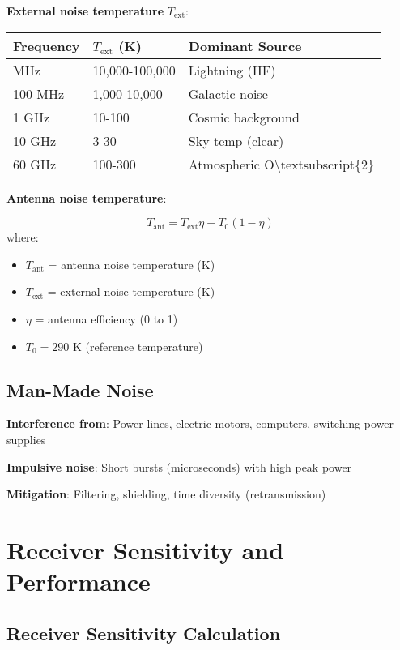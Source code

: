 \textbf{External noise temperature} $T_{\text{ext}}$:

{\def\LTcaptype{} %
\begin{longtable}[]{@{}lll@{}}
\toprule\noalign{}
Frequency & \(T_{\text{ext}}\) (K) & Dominant Source \\
\midrule\noalign{}
\endhead
\bottomrule\noalign{}
\endlastfoot
10 MHz & 10,000-100,000 & Lightning (HF) \\
100 MHz & 1,000-10,000 & Galactic noise \\
1 GHz & 10-100 & Cosmic background \\
10 GHz & 3-30 & Sky temp (clear) \\
60 GHz & 100-300 & Atmospheric O\textbackslash textsubscript\{2\} \\
\end{longtable}
}

\textbf{Antenna noise temperature}:

\begin{equation}
T_{\text{ant}} = T_{\text{ext}} \eta + T_0 (1 - \eta)
\end{equation}
where:
\begin{itemize}
\item $T_{\text{ant}}$ = antenna noise temperature (K)
\item $T_{\text{ext}}$ = external noise temperature (K)
\item $\eta$ = antenna efficiency (0 to 1)
\item $T_0 = 290$ K (reference temperature)
\end{itemize}

\subsection{Man-Made Noise}

\textbf{Interference from}: Power lines, electric motors, computers, switching power supplies

\textbf{Impulsive noise}: Short bursts (microseconds) with high peak power

\textbf{Mitigation}: Filtering, shielding, time diversity (retransmission)

\section{Receiver Sensitivity and Performance}

\subsection{Receiver Sensitivity Calculation}

